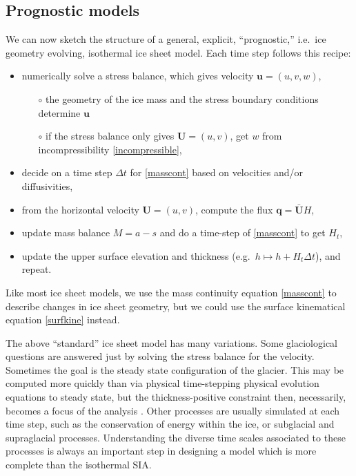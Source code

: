 \documentclass[letterpaper,final,12pt,reqno]{amsart}
\newcommand{\bq}{\mathbf{q}}
\newcommand{\bU}{\mathbf{U}}
\begin{document}
\subsection*{Prognostic models}  We can now sketch the structure of a general, explicit, ``prognostic,'' i.e.~ice geometry evolving, isothermal ice sheet model.  Each time step follows this recipe:
  \begin{itemize}
  \item numerically solve a stress balance, which gives velocity $\mathbf{u}=(u,v,w)$,
    \begin{itemize}
    \item[$\circ$] the geometry of the ice mass and the stress boundary conditions determine $\mathbf{u}$
    \item[$\circ$] if the stress balance only gives $\mathbf{U}=(u,v)$, get $w$ from incompressibility \eqref{incompressible},
    \end{itemize}
  \item decide on a time step $\Delta t$ for \eqref{masscont} based on velocities and/or diffusivities,
  \item from the horizontal velocity $\mathbf{U}=(u,v)$, compute the flux $\bq = \bar{\bU} H$,
  \item update mass balance $M=a-s$ and do a time-step of \eqref{masscont} to get $H_t$,
  \item update the upper surface elevation and thickness (e.g.~$h \mapsto h + H_t \Delta t$), and repeat.
  \end{itemize}
Like most ice sheet models, we use the mass continuity equation \eqref{masscont} to describe changes in ice sheet geometry, but we could use the surface kinematical equation \eqref{surfkine} instead.

The above ``standard'' ice sheet model has many variations.  Some glaciological questions are answered just by solving the stress balance for the velocity.  Sometimes the goal is the steady state configuration of the glacier.  This may be computed more quickly than via physical time-stepping physical evolution equations to steady state, but the thickness-positive constraint then, necessarily, becomes a focus of the analysis \cite{Bueler2016,JouvetBueler2012}.  Other processes are usually simulated at each time step, such as the conservation of energy within the ice, or subglacial and supraglacial processes.  Understanding the diverse time scales associated to these processes is always an important step in designing a model which is more complete than the isothermal SIA.
\end{document}
